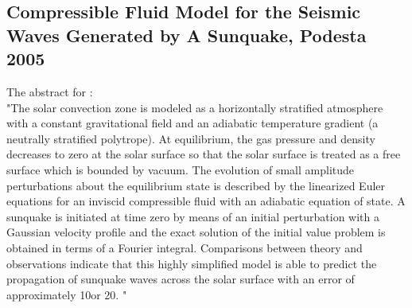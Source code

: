 \subsection{Compressible Fluid Model for the Seismic Waves Generated by A Sunquake, Podesta 2005}
The abstract for \cite{2005SoPh..232....1P}:\\"The solar convection zone is modeled as a horizontally stratified atmosphere with a constant gravitational field and an adiabatic temperature gradient (a neutrally stratified polytrope). At equilibrium, the gas pressure and density decreases to zero at the solar surface so that the solar surface is treated as a free surface which is bounded by vacuum. The evolution of small amplitude perturbations about the equilibrium state is described by the linearized Euler equations for an inviscid compressible fluid with an adiabatic equation of state. A sunquake is initiated at time zero by means of an initial perturbation with a Gaussian velocity profile and the exact solution of the initial value problem is obtained in terms of a Fourier integral. Comparisons between theory and observations indicate that this highly simplified model is able to predict the propagation of sunquake waves across the solar surface with an error of approximately 10\percent or 20\percent. "




